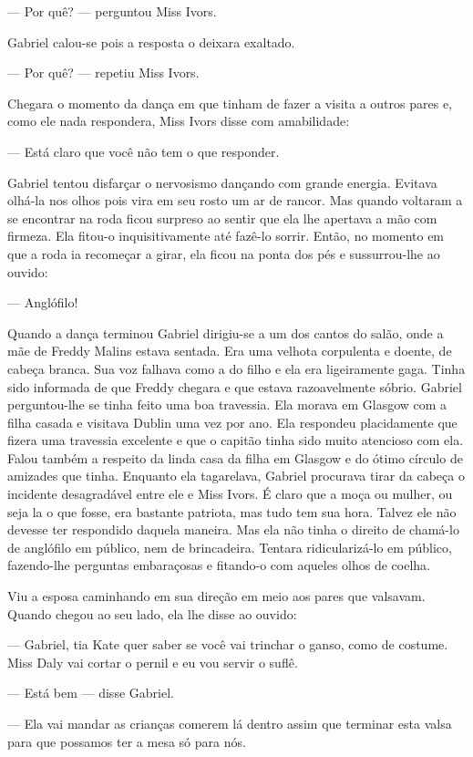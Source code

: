 --- Por quê? --- perguntou Miss Ivors.

Gabriel calou-se pois a resposta o deixara exaltado.

--- Por quê? --- repetiu Miss Ivors.

Chegara o momento da dança em que tinham de fazer a visita a outros pares e,
como ele nada respondera, Miss Ivors disse com amabilidade:

--- Está claro que você não tem o que responder.

Gabriel tentou disfarçar o nervosismo dançando com grande energia.  Evitava
olhá-la nos olhos pois vira em seu rosto um ar de rancor.  Mas quando voltaram
a se encontrar na roda ficou surpreso ao sentir que ela lhe apertava a mão com
firmeza.  Ela fitou-o inquisitivamente até fazê-lo sorrir.  Então, no momento
em que a roda ia recomeçar a girar, ela ficou na ponta dos pés e sussurrou-lhe
ao ouvido:

--- Anglófilo!

Quando a dança terminou Gabriel dirigiu-se a um dos cantos do salão, onde a mãe
de Freddy Malins estava sentada.  Era uma velhota corpulenta e doente, de
cabeça branca.  Sua voz falhava como a do filho e ela era ligeiramente gaga.
Tinha sido informada de que Freddy chegara e que estava razoavelmente sóbrio.
Gabriel perguntou-lhe se tinha feito uma boa travessia.  Ela morava em Glasgow
com a filha casada e visitava Dublin uma vez por ano.  Ela respondeu
placidamente que fizera uma travessia excelente e que o capitão tinha sido
muito atencioso com ela.  Falou também a respeito da linda casa da filha em
Glasgow e do ótimo círculo de amizades que tinha.  Enquanto ela tagarelava,
Gabriel procurava tirar da cabeça o incidente desagradável entre ele e Miss
Ivors.  É claro que a moça ou mulher, ou seja la o que fosse, era bastante
patriota, mas tudo tem sua hora.  Talvez ele não devesse ter respondido daquela
maneira.  Mas ela não tinha o direito de chamá-lo de anglófilo em público, nem
de brincadeira.  Tentara ridicularizá-lo em público, fazendo-lhe perguntas
embaraçosas e fitando-o com aqueles olhos de coelha.

Viu a esposa caminhando em sua direção em meio aos pares que valsavam.  Quando
chegou ao seu lado, ela lhe disse ao ouvido:

--- Gabriel, tia Kate quer saber se você vai trinchar o ganso, como de costume.
Miss Daly vai cortar o pernil e eu vou servir o suflê.

--- Está bem --- disse Gabriel.

--- Ela vai mandar as crianças comerem lá dentro assim que terminar esta valsa
para que possamos ter a mesa só para nós.

